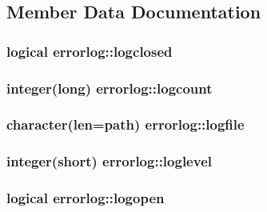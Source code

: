 \subsection{Member Data Documentation}
\hypertarget{classerrorlog_af9add736038cc71b13ee19df6544f3e5}{
\subsubsection[{logclosed}]{\setlength{\rightskip}{0pt plus 5cm}logical errorlog\+::logclosed\hspace{0.3cm}{\ttfamily [private]}}}\label{classerrorlog_af9add736038cc71b13ee19df6544f3e5}
\hypertarget{classerrorlog_a056ccc9457985050fb6391dd4abf1f2c}{
\subsubsection[{logcount}]{\setlength{\rightskip}{0pt plus 5cm}integer(long) errorlog\+::logcount\hspace{0.3cm}{\ttfamily [private]}}}\label{classerrorlog_a056ccc9457985050fb6391dd4abf1f2c}
\hypertarget{classerrorlog_a42e82497abf38d3e1683b51b48a5e4c0}{
\subsubsection[{logfile}]{\setlength{\rightskip}{0pt plus 5cm}character(len=path) errorlog\+::logfile\hspace{0.3cm}{\ttfamily [private]}}}\label{classerrorlog_a42e82497abf38d3e1683b51b48a5e4c0}
\hypertarget{classerrorlog_a3ab7fc512e499660dcb9a9542aab02b5}{
\subsubsection[{loglevel}]{\setlength{\rightskip}{0pt plus 5cm}integer(short) errorlog\+::loglevel\hspace{0.3cm}{\ttfamily [private]}}}\label{classerrorlog_a3ab7fc512e499660dcb9a9542aab02b5}
\hypertarget{classerrorlog_a3a12f9c3cbb079a8cbb7b5790ea2c827}{
\subsubsection[{logopen}]{\setlength{\rightskip}{0pt plus 5cm}logical errorlog\+::logopen\hspace{0.3cm}{\ttfamily [private]}}}\label{classerrorlog_a3a12f9c3cbb079a8cbb7b5790ea2c827}
